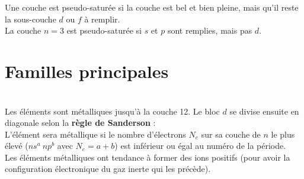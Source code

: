 \documentclass[13pt, twoside, a4paper, french, tikz]{report}
\begin{document}
    Une couche est pseudo-saturée si la couche est bel et bien pleine, mais qu'il reste la sous-couche $d$ ou $f$ à remplir.\\
    La couche $n=3$ est pseudo-saturée si $s$ et $p$ sont remplies, mais pas $d$.
  
  
  \section{Familles principales}\label{sec:familles-principales}
    
    
    \vspace{4pt}\\
    
    Les éléments sont métalliques jusqu'à la couche 12.
    Le bloc $d$ se divise ensuite en diagonale selon la \textbf{règle de Sanderson} :\\
    L'élément sera métallique si le nombre d'électrons $N_e$ sur sa couche de $n$ le plus élevé ($ns^a\ np^b$ avec $N_e = a + b$) est inférieur ou égal au numéro de la période.\\
    Les éléments métalliques ont tendance à former des ions positifs (pour avoir la configuration électronique du gaz inerte qui les précède).
\end{document}
